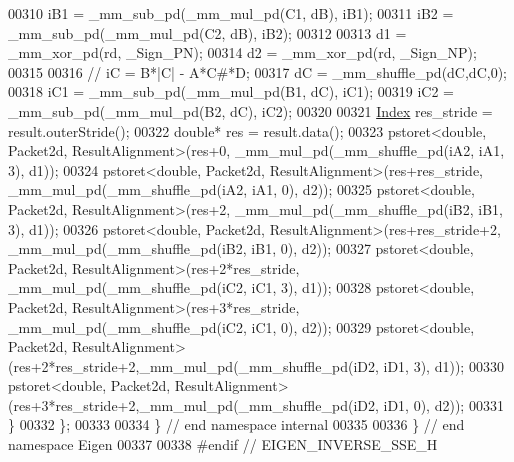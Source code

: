 \begin{DoxyCode}
00310     iB1 = \_mm\_sub\_pd(\_mm\_mul\_pd(C1, dB), iB1);
00311     iB2 = \_mm\_sub\_pd(\_mm\_mul\_pd(C2, dB), iB2);
00312 
00313     d1 = \_mm\_xor\_pd(rd, \_Sign\_PN);
00314     d2 = \_mm\_xor\_pd(rd, \_Sign\_NP);
00315 
00316     \textcolor{comment}{//  iC = B*|C| - A*C#*D;}
00317     dC = \_mm\_shuffle\_pd(dC,dC,0);
00318     iC1 = \_mm\_sub\_pd(\_mm\_mul\_pd(B1, dC), iC1);
00319     iC2 = \_mm\_sub\_pd(\_mm\_mul\_pd(B2, dC), iC2);
00320 
00321     \hyperlink{namespace_eigen_a62e77e0933482dafde8fe197d9a2cfde}{Index} res\_stride = result.outerStride();
00322     \textcolor{keywordtype}{double}* res = result.data();
00323     pstoret<double, Packet2d, ResultAlignment>(res+0,             \_mm\_mul\_pd(\_mm\_shuffle\_pd(iA2, iA1, 3), 
      d1));
00324     pstoret<double, Packet2d, ResultAlignment>(res+res\_stride,    \_mm\_mul\_pd(\_mm\_shuffle\_pd(iA2, iA1, 0), 
      d2));
00325     pstoret<double, Packet2d, ResultAlignment>(res+2,             \_mm\_mul\_pd(\_mm\_shuffle\_pd(iB2, iB1, 3), 
      d1));
00326     pstoret<double, Packet2d, ResultAlignment>(res+res\_stride+2,  \_mm\_mul\_pd(\_mm\_shuffle\_pd(iB2, iB1, 0), 
      d2));
00327     pstoret<double, Packet2d, ResultAlignment>(res+2*res\_stride,  \_mm\_mul\_pd(\_mm\_shuffle\_pd(iC2, iC1, 3), 
      d1));
00328     pstoret<double, Packet2d, ResultAlignment>(res+3*res\_stride,  \_mm\_mul\_pd(\_mm\_shuffle\_pd(iC2, iC1, 0), 
      d2));
00329     pstoret<double, Packet2d, ResultAlignment>(res+2*res\_stride+2,\_mm\_mul\_pd(\_mm\_shuffle\_pd(iD2, iD1, 3), 
      d1));
00330     pstoret<double, Packet2d, ResultAlignment>(res+3*res\_stride+2,\_mm\_mul\_pd(\_mm\_shuffle\_pd(iD2, iD1, 0), 
      d2));
00331   \}
00332 \};
00333 
00334 \} \textcolor{comment}{// end namespace internal}
00335 
00336 \} \textcolor{comment}{// end namespace Eigen}
00337 
00338 \textcolor{preprocessor}{#endif // EIGEN\_INVERSE\_SSE\_H}
\end{DoxyCode}
